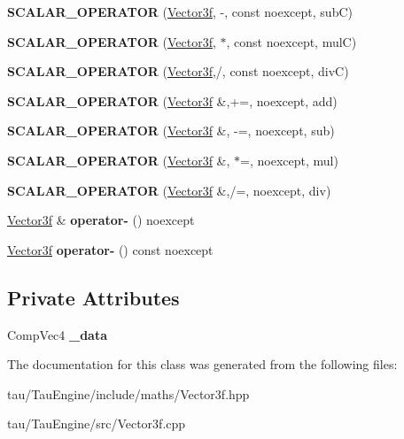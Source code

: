 \begin{DoxyCompactItemize}
{\bfseries S\+C\+A\+L\+A\+R\+\_\+\+O\+P\+E\+R\+A\+T\+OR} (\mbox{\hyperlink{class_vector3f}{Vector3f}}, -\/, const noexcept, subC)
\item 
\mbox{\label{class_vector3f_a0e370ab49624383e04d20dad9f8294ea}} 
{\bfseries S\+C\+A\+L\+A\+R\+\_\+\+O\+P\+E\+R\+A\+T\+OR} (\mbox{\hyperlink{class_vector3f}{Vector3f}}, $\ast$, const noexcept, mulC)
\item 
\mbox{\label{class_vector3f_acde0572b360ea640cff039cb3d829260}} 
{\bfseries S\+C\+A\+L\+A\+R\+\_\+\+O\+P\+E\+R\+A\+T\+OR} (\mbox{\hyperlink{class_vector3f}{Vector3f}},/, const noexcept, divC)
\item 
\mbox{\label{class_vector3f_a3ed47a71d98e926d317640a22691e66b}} 
{\bfseries S\+C\+A\+L\+A\+R\+\_\+\+O\+P\+E\+R\+A\+T\+OR} (\mbox{\hyperlink{class_vector3f}{Vector3f}} \&,+=, noexcept, add)
\item 
\mbox{\label{class_vector3f_a855c7498a8ebc45706febde31a7af47a}} 
{\bfseries S\+C\+A\+L\+A\+R\+\_\+\+O\+P\+E\+R\+A\+T\+OR} (\mbox{\hyperlink{class_vector3f}{Vector3f}} \&, -\/=, noexcept, sub)
\item 
\mbox{\label{class_vector3f_a6f5460b9e7f65cd514648395538676cc}} 
{\bfseries S\+C\+A\+L\+A\+R\+\_\+\+O\+P\+E\+R\+A\+T\+OR} (\mbox{\hyperlink{class_vector3f}{Vector3f}} \&, $\ast$=, noexcept, mul)
\item 
\mbox{\label{class_vector3f_ab14cd359d52fe6c38d85840808940656}} 
{\bfseries S\+C\+A\+L\+A\+R\+\_\+\+O\+P\+E\+R\+A\+T\+OR} (\mbox{\hyperlink{class_vector3f}{Vector3f}} \&,/=, noexcept, div)
\item 
\mbox{\label{class_vector3f_a24c62b1fe1d2f18f9289f36e0b06857c}} 
\mbox{\hyperlink{class_vector3f}{Vector3f}} \& {\bfseries operator-\/} () noexcept
\item 
\mbox{\label{class_vector3f_a0ae27c6a481043c1e8c1935ccde73b1c}} 
\mbox{\hyperlink{class_vector3f}{Vector3f}} {\bfseries operator-\/} () const noexcept
\end{DoxyCompactItemize}
\subsection*{Private Attributes}
\begin{DoxyCompactItemize}
\item 
\mbox{\label{class_vector3f_a8dd741fdb0ea0a3bd9aaf0e110b7c45c}} 
Comp\+Vec4 {\bfseries \+\_\+data}
\end{DoxyCompactItemize}


The documentation for this class was generated from the following files\+:\begin{DoxyCompactItemize}
\item 
tau/\+Tau\+Engine/include/maths/Vector3f.\+hpp\item 
tau/\+Tau\+Engine/src/Vector3f.\+cpp\end{DoxyCompactItemize}
